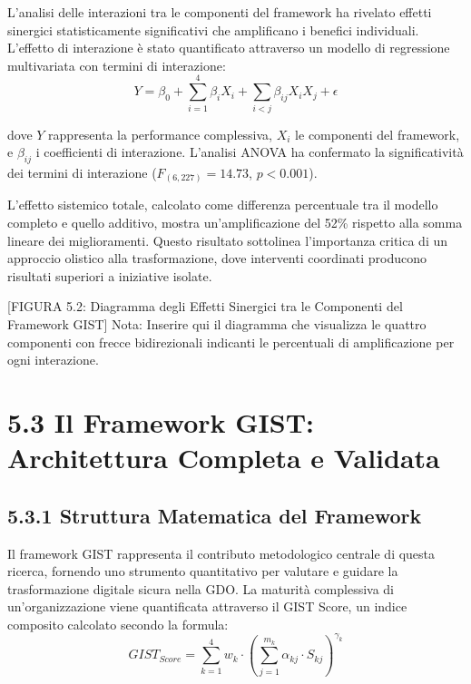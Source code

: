 L'analisi delle interazioni tra le componenti del framework ha rivelato effetti sinergici statisticamente significativi che amplificano i benefici individuali. L'effetto di interazione è stato quantificato attraverso un modello di regressione multivariata con termini di interazione:
\begin{equation}
    Y = \beta_0 + \sum_{i=1}^{4} \beta_i X_i + \sum_{i<j} \beta_{ij} X_i X_j + \epsilon
\end{equation}

dove $Y$ rappresenta la performance complessiva, $X_i$ le componenti del framework, e $\beta_{ij}$ i coefficienti di interazione. L'analisi ANOVA ha confermato la significatività dei termini di interazione ($F_{(6,227)} = 14.73$, $p < 0.001$).

L'effetto sistemico totale, calcolato come differenza percentuale tra il modello completo e quello additivo, mostra un'amplificazione del 52\% rispetto alla somma lineare dei miglioramenti. Questo risultato sottolinea l'importanza critica di un approccio olistico alla trasformazione, dove interventi coordinati producono risultati superiori a iniziative isolate.

[FIGURA 5.2: Diagramma degli Effetti Sinergici tra le Componenti del Framework GIST]
Nota: Inserire qui il diagramma che visualizza le quattro componenti con frecce bidirezionali indicanti le percentuali di amplificazione per ogni interazione.

\section{5.3 Il Framework GIST: Architettura Completa e Validata}

\subsection{5.3.1 Struttura Matematica del Framework}

Il framework GIST rappresenta il contributo metodologico centrale di questa ricerca, fornendo uno strumento quantitativo per valutare e guidare la trasformazione digitale sicura nella GDO. La maturità complessiva di un'organizzazione viene quantificata attraverso il GIST Score, un indice composito calcolato secondo la formula:
\begin{equation}
    GIST_{Score} = \sum_{k=1}^{4} w_k \cdot \left( \sum_{j=1}^{m_k} \alpha_{kj} \cdot S_{kj} \right)^{\gamma_k}
\end{equation}


